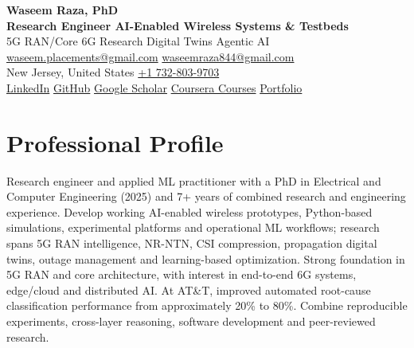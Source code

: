 \documentclass[9pt,letterpaper]{extarticle}
\begin{document}
\begin{center}
{\LARGE\bfseries Waseem Raza, PhD}{\normalsize\mdseries }\\[2pt]
{\large\bfseries Research Engineer \textbar{} AI-Enabled Wireless Systems \& Testbeds}\\[1pt]
{\small 5G RAN/Core \textbar{} 6G Research \textbar{} Digital Twins \textbar{} Agentic AI}\\[3pt]
{\footnotesize {}\enspace \href{mailto:waseem.placements@gmail.com}{waseem.placements@gmail.com} \textbar{} \href{mailto:waseemraza844@gmail.com}{waseemraza844@gmail.com}\\[1pt]New Jersey, United States \quad {}\enspace \href{tel:+17328039703}{+1 732-803-9703}\\[1pt]\href{https://www.linkedin.com/in/waseem-raza-phd-9a737858/}{LinkedIn} \textbar{} \href{https://github.com/WaseemRaza844}{GitHub} \textbar{} \href{https://scholar.google.com/citations?user=d58Drr0AAAAJ\&hl=en}{Google Scholar} \textbar{} \href{https://waseemraza844.github.io/portfolio/learning.html}{Coursera Courses} \textbar{} \href{https://waseemraza844.github.io/portfolio/}{Portfolio}}
\end{center}
\vspace{-5pt}
\section{Professional Profile}
Research engineer and applied ML practitioner with a PhD in Electrical and Computer Engineering (2025) and 7+ years of combined research and engineering experience. Develop working AI-enabled wireless prototypes, Python-based simulations, experimental platforms and operational ML workflows; research spans 5G RAN intelligence, NR-NTN, CSI compression, propagation digital twins, outage management and learning-based optimization. Strong foundation in 5G RAN and core architecture, with interest in end-to-end 6G systems, edge/cloud and distributed AI. At AT\&T, improved automated root-cause classification performance from approximately 20\% to 80\%. Combine reproducible experiments, cross-layer reasoning, software development and peer-reviewed research.
\end{document}
